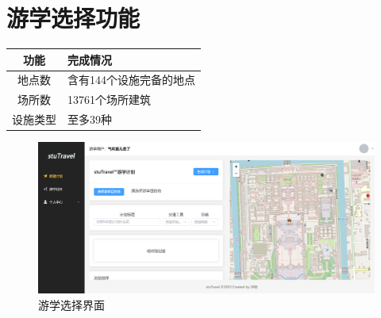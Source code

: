 \documentclass{report}
\begin{document}
\section{游学选择功能}
\begin{table}[!ht]
    \centering
    \begin{tabularx}{\textwidth}{|c|X|}
    \hline
        \textbf{功能} & \textbf{完成情况} \\ \hline
        地点数 & 含有144个设施完备的地点 \\ \hline
        场所数 & 13761个场所建筑 \\ \hline
        设施类型 & 至多39种 \\ \hline
    \end{tabularx}
\end{table}
\begin{figure}[h]
    \begin{center}
        \includegraphics*[width=\textwidth]{figure/2.1.png}
    \end{center}
    \caption{游学选择界面}
\end{figure}
\end{document}
